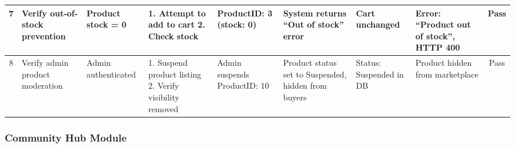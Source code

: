 \begin{table}[H]
{\begin{tabular}{|c|p{3cm}|p{2.5cm}|p{3.5cm}|p{3cm}|p{3cm}|p{2.5cm}|p{2.5cm}|c|}
7 & Verify out-of-stock prevention & Product stock = 0 & 1. Attempt to add to cart 2. Check stock & ProductID: 3 (stock: 0) & System returns ``Out of stock'' error & Cart unchanged & Error: ``Product out of stock'', HTTP 400 & Pass \\ \hline
8 & Verify admin product moderation & Admin authenticated & 1. Suspend product listing 2. Verify visibility removed & Admin suspends ProductID: 10 & Product status set to Suspended, hidden from buyers & Status: Suspended in DB & Product hidden from marketplace & Pass \\ \hline
\end{tabular}%
}
\label{tab:ut_marketplace}
\end{table}

\subsubsection{Community Hub Module}


